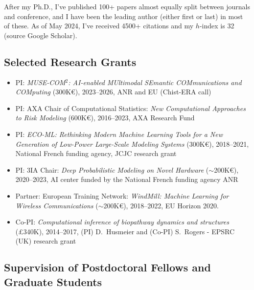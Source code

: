 \documentclass[oneside, a4paper, onecolumn, 10pt]{article}
\begin{document}
After my Ph.D., I've published 100+ papers almost equally split between journals and conference, and I have been the leading author (either first or last) in most of these.
As of May 2024, I've received 4500+ citations and my $h$-index is 32 (source Google Scholar).

\subsection*{Selected Research Grants}
\begin{itemize}
  \item PI: \emph{MUSE-COM$^2$: AI-enabled MUltimodal SEmantic COMmunications and COMputing} (300K\euro), 2023--2026, ANR and EU (Chist-ERA call)
  \item PI: AXA Chair of Computational Statistics: \emph{New Computational Approaches to Risk Modeling} (600K\euro), 2016--2023, AXA Research Fund 
  \item PI: \emph{ECO-ML: Rethinking Modern Machine Learning Tools for a New Generation of Low-Power Large-Scale Modeling Systems} (300K\euro), 2018--2021, National French funding agency, JCJC research grant
  \item PI: 3IA Chair: \emph{Deep Probabilistic Modeling on Novel Hardware} ($\sim$200K\euro), 2020--2023, AI center funded by the National French funding agency ANR
  \item Partner: European Training Network: \emph{WindMill: Machine Learning for Wireless Communications} ($\sim$200K\euro), 2018--2022, EU Horizon 2020.
  \item Co-PI: \emph{Computational inference of biopathway dynamics and structures} (\pounds 340K), 2014--2017, (PI) D.~Husmeier and (Co-PI) S.~Rogers - EPSRC (UK) research grant 
\end{itemize}



\subsection*{Supervision of Postdoctoral Fellows and Graduate Students}
\end{document}
